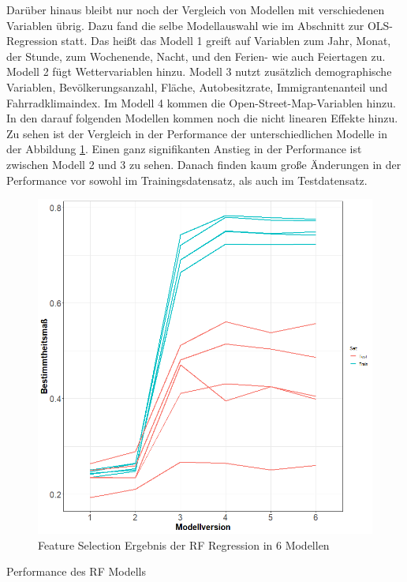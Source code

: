 \documentclass[a4paper,12pt]{thesis}
\begin{document}
Darüber hinaus bleibt nur noch der Vergleich von Modellen mit verschiedenen Variablen übrig. Dazu fand die selbe Modellauswahl wie im Abschnitt zur OLS-Regression statt. Das heißt das Modell 1 greift auf Variablen zum Jahr, Monat, der Stunde, zum Wochenende, Nacht, und den Ferien- wie auch Feiertagen zu. Modell 2 fügt Wettervariablen hinzu. Modell 3 nutzt zusätzlich demographische Variablen, Bevölkerungsanzahl, Fläche, Autobesitzrate, Immigrantenanteil und Fahrradklimaindex. Im Modell 4 kommen die Open-Street-Map-Variablen hinzu. In den darauf folgenden Modellen kommen noch die nicht linearen Effekte hinzu. Zu sehen ist der Vergleich in der Performance der unterschiedlichen Modelle in der Abbildung \ref{RF_ModelSelection}. Einen ganz signifikanten Anstieg in der Performance ist zwischen Modell 2 und 3 zu sehen. Danach finden kaum große Änderungen in der Performance vor sowohl im Trainingsdatensatz, als auch im Testdatensatz.

\begin{figure}[!ht]
	\centering
	\includegraphics[width=\textwidth]{Plots/plot40.png}
	\caption{Feature Selection Ergebnis der RF Regression in 6 Modellen}
	\label{RF_ModelSelection}
\end{figure}

\begin{table}
	\caption{Performance des RF Modells}
	\label{tbl:FR1}
\end{table}
\end{document}

